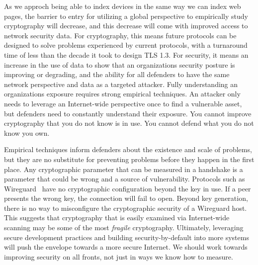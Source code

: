 As we approch being able to index devices in the same way we can index web
pages, the barrier to entry for utilizing a global perspective to empirically
study cryptography will decrease, and this decrease will come with improved
access to network security data. For cryptography, this means future
protocols can be designed to solve problems experienced by current protocols,
with a turnaround time of less than the decade it took to design TLS 1.3. For
security, it means an increase in the use of data to show that an
organizations security posture is improving or degrading, and the ability for
all defenders to have the same network perspective and data as a targeted
attacker. Fully understanding an organizations exposure requires strong
empirical techniques. An attacker only needs to leverage an Internet-wide
perspective once to find a vulnerable asset, but defenders need to constantly
understand their exposure. You cannot improve cryptography that you do not
know is in use. You cannot defend what you do not know you own.

Empirical techniques inform defenders about the existence and scale of
problems, but they are no substitute for preventing problems before they
happen in the first place. Any cryptographic parameter that can be measured
in a handshake is a parameter that could be wrong and a source of
vulnerability. Protocols such as Wireguard~\cite{wireguard-2017} have no
cryptographic configuration beyond the key in use. If a peer presents the
wrong key, the connection will fail to open. Beyond key generation, there is
no way to misconfigure the cryptographic security of a Wireguard host. This
suggests that cryptography that is easily examined via Internet-wide scanning
may be some of the most \textit{fragile} cryptography.
Ultimately, leveraging secure development practices and building
security-by-default into more systems will push the envelope towards a more
secure Internet. We should work towards improving security on all fronts, not
just in ways we know how to measure.





